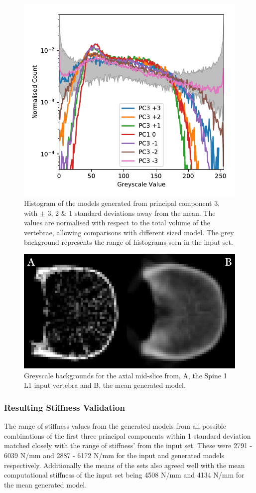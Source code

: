\begin{figure}[h!]
  \centering
  \includegraphics[width=.65\textwidth]{Chapters/Chapter_PCA_images/pca3_histo.pdf}
  \caption{Histogram of the models generated from principal component 3, with $\pm$ 3, 2 \& 1 standard deviations away from the mean. The values are normalised with respect to the total volume of the vertebrae, allowing comparisons with different sized model. The grey background represents the range of histograms seen in the input set.}
  \label{fig:pca3_histo}
\end{figure}

\begin{figure}[h!]
  \centering
  \includegraphics[width=.6\textwidth]{Chapters/Chapter_PCA_images/INPUT_GEN_BACKGROUND.png}
	\caption{Greyscale backgrounds for the axial mid-slice from, A, the Spine 1 L1 input vertebra and B, the mean generated model.}
  \label{fig:input_gen_background}
\end{figure}
\subsubsection{Resulting Stiffness Validation}

The range of stiffness values from the generated models from all possible combinations of the first three principal components within 1 standard deviation matched closely with the range of stiffness' from the input set. These were 2791 - 6039 N/mm and 2887 - 6172 N/mm for the input and generated models respectively. Additionally the means of the sets also agreed well with the mean computational stiffness of the input set being 4508 N/mm and 4134 N/mm for the mean generated model.

